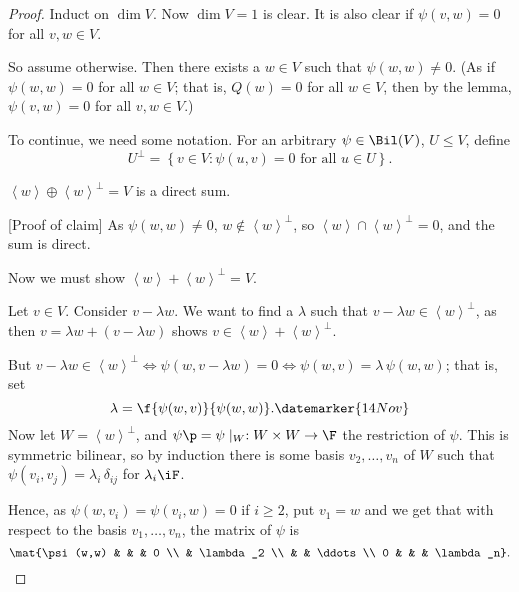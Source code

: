 \begin{proof}
	Induct on $\dim V$. Now $\dim V=1$ is clear. It is also clear if $\psi(v,w) = 0 $ for all $v,w \in V$.%

	So assume otherwise. Then there exists a $w \in V$ such that $\psi(w,w)\neq 0$. (As if $\psi(w,w)=0$ for all $w\in V$; that is, $Q(w)=0$ for all $w\in V$, then by the lemma, $\psi(v,w)=0$ for all $v,w\in V$.) %

\bigskip

To continue, we need some notation. For an arbitrary $\psi\in\Bil(V)$, $U\leq V$, define
\begin{equation*}
	U^\perp = \left\{v\in V : \psi(u,v) = 0 \text{ for all } u\in U\right\}.
\end{equation*}

\begin{claim}
	$\left\langle w \right\rangle \oplus \left\langle w \right\rangle^\perp = V$ is a direct sum. %
\end{claim}


	[Proof of claim] As $\psi(w,w)\neq 0$, $w\not\in\left\langle w \right\rangle^\perp$, so $\left\langle w \right\rangle\cap\left\langle w \right\rangle^\perp = 0$, and the sum is direct. %
	
	Now we must show $\left\langle w \right\rangle + \left\langle w \right\rangle^\perp = V$. %
	
	Let $v\in V$. Consider $v-\lambda w$. We want to find a $\lambda$ such that $v-\lambda w\in\left\langle w \right\rangle^\perp$, as then $v=\lambda w+\left( v-\lambda w \right)$ shows $v\in\left\langle w \right\rangle+\left\langle w \right\rangle^\perp$. %

	But $v-\lambda w\in\left\langle w \right\rangle^\perp \iff \psi(w,v-\lambda w) = 0 \iff \psi(w,v) = \lambda\,\psi(w,w)$; that is, set %
	\begin{equation*}
		\lambda = \f{\psi(w,v)}{\psi(w,w)}.
		\datemarker{14 Nov}
	\end{equation*}
	Now let $W=\left\langle w \right\rangle^\perp$, and $\psi\p = \psi\mid_W: W \times W \to \F$ the restriction of $\psi$. This is symmetric bilinear, so by induction there is some basis $v_2,\ldots,v_n$ of $W$ such that $\psi(v_i,v_j) = \lambda_i \, \delta_{ij}$ for $\lambda_i \iF$. %

	Hence, as $\psi(w,v_i) = \psi(v_i,w) = 0$ if $i\geq 2$, put $v_1=w$ and we get that with respect to the basis $v_1,\ldots,v_n$, the matrix of $\psi$ is %
	\begin{equation*}
		\mat{\psi(w,w) & & & 0 \\ & \lambda_2 \\ & & \ddots \\ 0 & & & \lambda_n}. \qedhere
	\end{equation*}
\end{proof}

